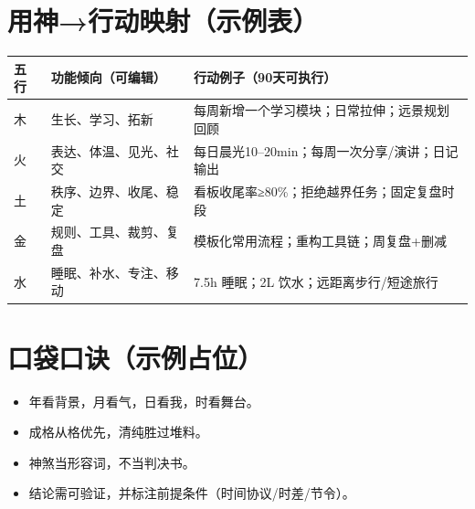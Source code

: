 \documentclass[
  chinese,
  letterpaper,
  DIV=11,
  numbers=noendperiod]{scrartcl}
\providecommand{\tightlist}{%
  \setlength{\itemsep}{0pt}\setlength{\parskip}{0pt}}
\begin{document}
\section{用神→行动映射（示例表）}\label{ux7528ux795eux884cux52a8ux6620ux5c04ux793aux4f8bux8868}

\begin{longtable}[]{@{}
  >{\raggedright\arraybackslash}p{}
  >{\raggedright\arraybackslash}p{}
  >{\raggedright\arraybackslash}p{}@{}}
\toprule\noalign{}
\begin{minipage}[b]{\linewidth}\raggedright
五行
\end{minipage} & \begin{minipage}[b]{\linewidth}\raggedright
功能倾向（可编辑）
\end{minipage} & \begin{minipage}[b]{\linewidth}\raggedright
行动例子（90天可执行）
\end{minipage} \\
\midrule\noalign{}
\endhead
\bottomrule\noalign{}
\endlastfoot
木 & 生长、学习、拓新 & 每周新增一个学习模块；日常拉伸；远景规划回顾 \\
火 & 表达、体温、见光、社交 &
每日晨光10--20min；每周一次分享/演讲；日记输出 \\
土 & 秩序、边界、收尾、稳定 &
看板收尾率≥80\%；拒绝越界任务；固定复盘时段 \\
金 & 规则、工具、裁剪、复盘 & 模板化常用流程；重构工具链；周复盘+删减 \\
水 & 睡眠、补水、专注、移动 & 7.5h 睡眠；2L 饮水；远距离步行/短途旅行 \\
\end{longtable}

\section{口袋口诀（示例占位）}\label{ux53e3ux888bux53e3ux8bc0ux793aux4f8bux5360ux4f4d}

\begin{itemize}
\tightlist
\item
  年看背景，月看气，日看我，时看舞台。
\item
  成格从格优先，清纯胜过堆料。
\item
  神煞当形容词，不当判决书。
\item
  结论需可验证，并标注前提条件（时间协议/时差/节令）。
\end{itemize}
\end{document}
